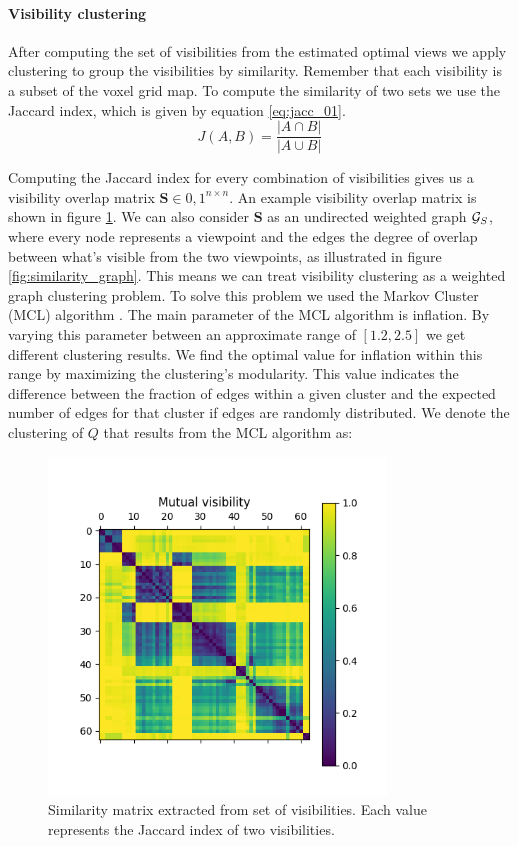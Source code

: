 \paragraph{Visibility clustering}
After computing the set of visibilities from the estimated optimal views we apply clustering to group the visibilities by similarity. Remember that each visibility is a subset of the voxel grid map. To compute the similarity of two sets we use the Jaccard index, which is given by equation \ref{eq:jacc_01}.
\begin{equation}
    \label{eq:jacc_01}
    J(A,B) = \frac{|A \cap B|}{|A \cup B|}
\end{equation}

Computing the Jaccard index for every combination of visibilities gives us a visibility overlap matrix \(\boldsymbol{S} \in {0, 1}^{n \times n}\).  An example visibility overlap matrix is shown in figure \ref{fig:jaccard}. We can also consider \(\boldsymbol{S}\) as an undirected weighted graph \(\mathcal{G}_S\), where every node represents a viewpoint and the edges the degree of overlap between what's visible from the two viewpoints, as illustrated in figure \ref{fig:similarity_graph}. This means we can treat visibility clustering as a weighted graph clustering problem. To solve this problem we used the Markov Cluster (MCL) algorithm \citep{van_dongen_cluster_2000}. The main parameter of the MCL algorithm is inflation. By varying this parameter between an approximate range of \([1.2, 2.5]\) we get different clustering results. We find the optimal value for inflation within this range by maximizing the clustering's modularity. This value indicates the difference between the fraction of edges within a given cluster and the expected number of edges for that cluster if edges are randomly distributed. We denote the clustering of \(Q\) that results from the MCL algorithm as:


\begin{figure}[h]
    \centering
    \includegraphics*[width=0.8\textwidth]{./fig/mutual_visibility_matrix.png}
    \caption{Similarity matrix extracted from set of visibilities. Each value represents the Jaccard index of two visibilities.}
    \label{fig:jaccard}
\end{figure}


